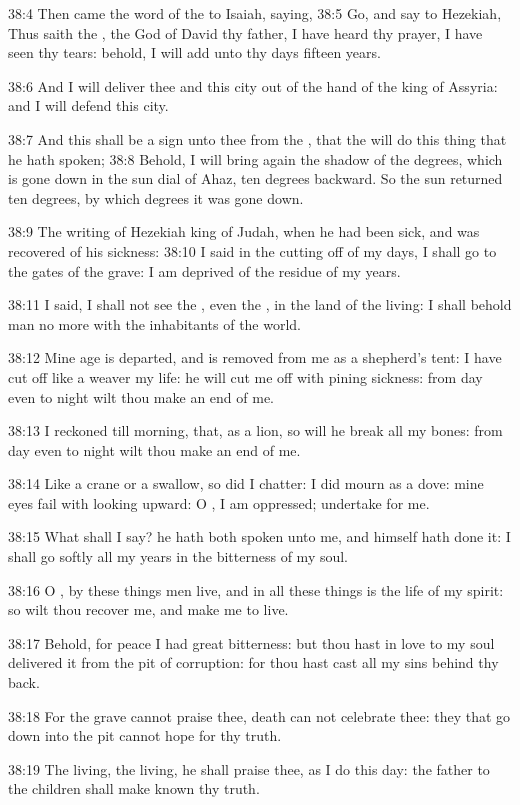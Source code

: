 38:4 Then came the word of the \LORD to Isaiah, saying, 38:5 Go, and say to Hezekiah, Thus saith the \LORD, the God of David thy father, I have heard thy prayer, I have seen thy tears: behold, I will add unto thy days fifteen years.

38:6 And I will deliver thee and this city out of the hand of the king of Assyria: and I will defend this city.

38:7 And this shall be a sign unto thee from the \LORD, that the \LORD will do this thing that he hath spoken; 38:8 Behold, I will bring again the shadow of the degrees, which is gone down in the sun dial of Ahaz, ten degrees backward. So the sun returned ten degrees, by which degrees it was gone down.

38:9 The writing of Hezekiah king of Judah, when he had been sick, and was recovered of his sickness: 38:10 I said in the cutting off of my days, I shall go to the gates of the grave: I am deprived of the residue of my years.

38:11 I said, I shall not see the \LORD, even the \LORD, in the land of the living: I shall behold man no more with the inhabitants of the world.

38:12 Mine age is departed, and is removed from me as a shepherd's tent: I have cut off like a weaver my life: he will cut me off with pining sickness: from day even to night wilt thou make an end of me.

38:13 I reckoned till morning, that, as a lion, so will he break all my bones: from day even to night wilt thou make an end of me.

38:14 Like a crane or a swallow, so did I chatter: I did mourn as a dove: mine eyes fail with looking upward: O \LORD, I am oppressed; undertake for me.

38:15 What shall I say? he hath both spoken unto me, and himself hath done it: I shall go softly all my years in the bitterness of my soul.

38:16 O \LORD, by these things men live, and in all these things is the life of my spirit: so wilt thou recover me, and make me to live.

38:17 Behold, for peace I had great bitterness: but thou hast in love to my soul delivered it from the pit of corruption: for thou hast cast all my sins behind thy back.

38:18 For the grave cannot praise thee, death can not celebrate thee: they that go down into the pit cannot hope for thy truth.

38:19 The living, the living, he shall praise thee, as I do this day: the father to the children shall make known thy truth.

